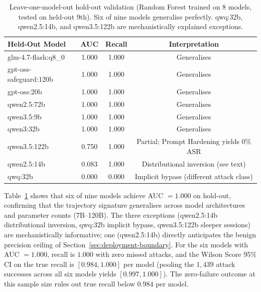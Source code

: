 \documentclass{article}
\begin{document}
\begin{table}[t]
\caption{Leave-one-model-out hold-out validation (Random Forest trained on 8 models, tested on held-out 9th). Six of nine models generalise perfectly. qwq:32b, qwen2.5:14b, and qwen3.5:122b are mechanistically explained exceptions.}
\label{tab:holdout}
\centering
\small
\begin{tabular}{lccc}
\toprule
\textbf{Held-Out Model} & \textbf{AUC} & \textbf{Recall} & \textbf{Interpretation} \\
\midrule
glm-4.7-flash:q8\_0     & 1.000 & 1.000 & Generalises \\
gpt-oss-safeguard:120b  & 1.000 & 1.000 & Generalises \\
gpt-oss:20b             & 1.000 & 1.000 & Generalises \\
qwen2.5:72b             & 1.000 & 1.000 & Generalises \\
qwen3.5:9b              & 1.000 & 1.000 & Generalises \\
qwen3:32b               & 1.000 & 1.000 & Generalises \\
qwen3.5:122b            & 0.750 & 1.000 & Partial; Prompt Hardening yields 0\% ASR \\
qwen2.5:14b             & 0.083 & 1.000 & Distributional inversion (see text) \\
qwq:32b                 & 0.000 & 0.000 & Implicit bypass (different attack class) \\
\bottomrule
\end{tabular}
\vspace{-2mm}
\end{table}

Table~\ref{tab:holdout} shows that six of nine models achieve AUC $= 1.000$ on hold-out, confirming that the trajectory signature generalises across model architectures and parameter counts (7B--120B). The three exceptions (qwen2.5:14b distributional inversion, qwq:32b implicit bypass, qwen3.5:122b sleeper sessions) are mechanistically informative; one (qwen2.5:14b) directly anticipates the benign precision ceiling of Section~\ref{sec:deployment-boundary}. For the six models with AUC $= 1.000$, recall is $1.000$ with zero missed attacks, and the Wilson Score 95\% CI on the true recall is $[0.984, 1.000]$ per model (pooling the $1{,}439$ attack successes across all six models yields $[0.997, 1.000]$). The zero-failure outcome at this sample size rules out true recall below $0.984$ per model.
\end{document}
